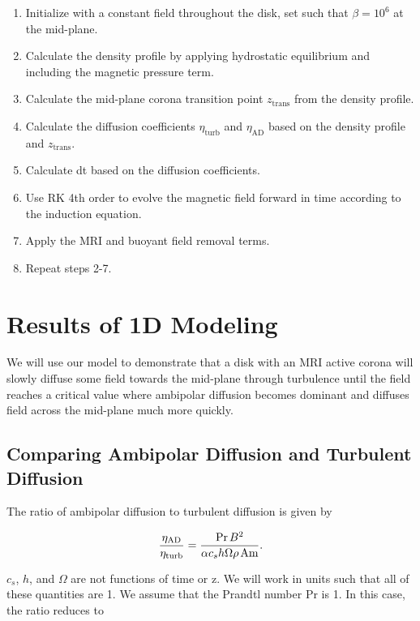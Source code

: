 \begin{enumerate}
\item{Initialize with a constant field throughout the disk, set such that $\beta=10^6$ at the mid-plane. }
\item{Calculate the density profile by applying hydrostatic equilibrium and including the magnetic pressure term.}
\item{Calculate the mid-plane corona transition point $z_{\text{trans}}$ from the density profile. }
\item{Calculate the diffusion coefficients $\eta_{\text{turb}}$ and $\eta_{\text{AD}}$ based on the density profile and $z_{\text{trans}}$.}
\item{Calculate dt based on the diffusion coefficients.}
\item{Use RK 4th order to evolve the magnetic field forward in time according to the induction equation.}
\item{Apply the MRI and buoyant field removal terms.}
\item{Repeat steps 2-7.}
\end{enumerate}





\newpage
\section{Results of 1D Modeling}
We will use our model to demonstrate that a disk with an MRI active corona will slowly diffuse some field towards the mid-plane through turbulence until the field reaches a critical value where ambipolar diffusion becomes dominant and diffuses field across the mid-plane much more quickly.


\subsection{Comparing Ambipolar Diffusion and Turbulent Diffusion}
The ratio of ambipolar diffusion to turbulent diffusion is given by

\begin{equation}
\frac{\eta_{\text{AD}}}{\eta_{\text{turb}}} = \frac{\text{Pr} \hspace{0.5mm} B^2}{\alpha c_s h \Omega \rho \hspace{0.5mm} \text{Am}}.
\end{equation}

\noindent $c_s$, $h$, and $\Omega$ are not functions of time or z.  We will work in units such that all of these quantities are 1.  We assume that the Prandtl number Pr is 1.  In this case, the ratio reduces to

